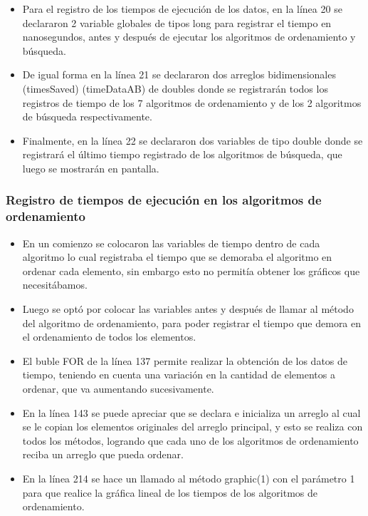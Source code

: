 \documentclass{article}
\begin{document}
	\begin{itemize}	
		\item Para el registro de los tiempos de ejecución de los datos, en la línea 20 se declararon 2 variable globales de tipos long para registrar el tiempo en nanosegundos, antes y después de ejecutar los algoritmos de ordenamiento y búsqueda.
        \item De igual forma en la línea 21 se declararon dos arreglos bidimensionales (timesSaved) (timeDataAB) de doubles donde se registrarán todos los registros de tiempo de los 7 algoritmos de ordenamiento y de los 2 algoritmos de búsqueda respectivamente.
        \item Finalmente, en la línea 22 se declararon dos variables de tipo double donde se registrará el último tiempo registrado de los algoritmos de búsqueda, que luego se mostrarán en pantalla.
	\end{itemize}

    \subsubsection{Registro de tiempos de ejecución en los algoritmos de ordenamiento}

    
	
	\begin{itemize}	
        \item En un comienzo se colocaron las variables de tiempo dentro de cada algoritmo lo cual registraba el tiempo que se demoraba el algoritmo en ordenar cada elemento, sin embargo esto no permitía obtener los gráficos que necesitábamos.
        \item Luego se optó por colocar las variables antes y después de llamar al método del algoritmo de ordenamiento, para poder registrar el tiempo que demora en el ordenamiento de todos los elementos.
        \item El buble FOR de la línea 137 permite realizar la obtención de los datos de tiempo, teniendo en cuenta una variación en la cantidad de elementos a ordenar, que va aumentando sucesivamente.
		\item En la línea 143 se puede apreciar que se declara e inicializa un arreglo al cual se le copian los elementos originales del arreglo principal, y esto se realiza con todos los métodos, logrando que cada uno de los algoritmos de ordenamiento reciba un arreglo que pueda ordenar.
        \item En la línea 214 se hace un llamado al método graphic(1) con el parámetro 1 para que realice la gráfica lineal de los tiempos de los algoritmos de ordenamiento.
	\end{itemize}
\end{document}
